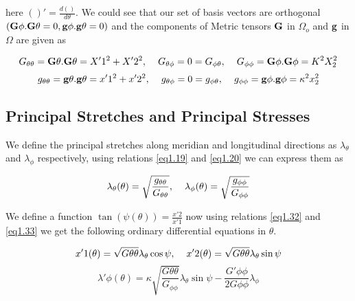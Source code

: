 \documentclass[12pt]{report}
\begin{document}
\begin{flushleft}
here $()'=\frac{d()}{d\theta}$. We could see that our set of basis vectors are orthogonal $({\bf{G}}{\phi}.{\bf{G}}{\theta} = 0,{\bf{g}}{\phi}.{\bf{g}}{\theta} = 0)$ and the components of Metric tensors ${\bf{G}}$ in $\Omega_{o}$ and ${\bf{g}}$ in $\Omega$ are given  as

\begin{equation}\label{eq1.31}
    G_{\theta\theta}={\bf{G}}{\theta}.{\bf{G}}{\theta}=X'{1}^{2}+X'{2}^{2},\hspace{4mm}
    G_{\theta\phi}=0=G_{\phi\theta},\hspace{4mm}
    G_{\phi\phi} = {\bf{G}}{\phi}.{\bf{G}}{\phi}=K^{2}X^{2}_{2}
\end{equation}
\vspace{-4mm}
\begin{equation}\label{eq1.32}
    g_{\theta\theta}={\bf{g}}{\theta}.{\bf{g}}{\theta}=x'{1}^{2}+x'{2}^{2},\hspace{4mm}
    g_{\theta\phi}=0=g_{\phi\theta},\hspace{4mm}
    g_{\phi\phi} = {\bf{g}}{\phi}.{\bf{g}}{\phi}=\kappa^{2}x^{2}_{2}
\end{equation}
\end{flushleft}

\subsection{Principal Stretches and Principal Stresses}
We define the principal stretches along meridian and longitudinal directions as $\lambda_{\theta}$ and $\lambda_{\phi}$ respectively, using relations \ref{eq1.19} and \ref{eq1.20} we can express them as

\begin{equation}\label{eq1.33}
    \lambda_{\theta}(\theta)=\sqrt{\frac{g_{\theta\theta}}{G_{\theta\theta}}},\hspace{4mm}
    \lambda_{\phi}(\theta)=\sqrt{\frac{g_{\phi\phi}}{G_{\phi\phi}}}
\end{equation}

\begin{flushleft}

We define a function $\tan(\psi(\theta))=\frac{x'{2}}{x'{1}}$ now using relations \ref{eq1.32} and \ref{eq1.33} we get the following ordinary differential equations in $\theta$.

\begin{equation}\label{eq1.34}
    x'{1}(\theta)=\sqrt{G{\theta\theta}}\lambda_{\theta}\cos\psi,\hspace{4mm}
    x'{2}(\theta)=\sqrt{G{\theta\theta}}\lambda_{\theta}\sin\psi
\end{equation}
\vspace{-4mm}
\begin{equation}\label{eq1.35}
    \lambda'{\phi}(\theta)=\kappa\sqrt{\frac{G{\theta\theta}}{G_{\phi\phi}}}
    \lambda_{\theta}\sin\psi-\frac{G'{\phi\phi}}{2G{\phi\phi}}\lambda_{\phi}
\end{equation}





\end{flushleft}
\end{document}
